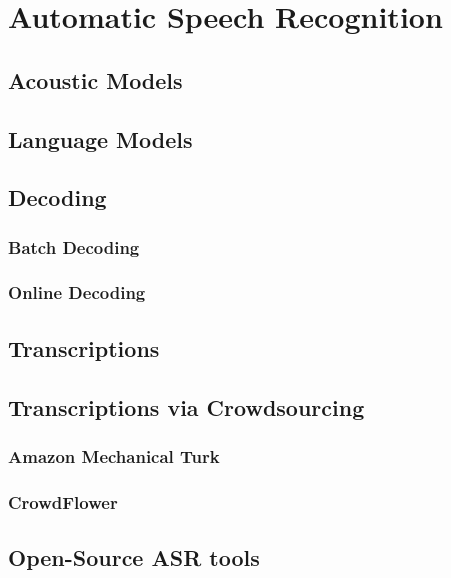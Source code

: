 \chapter{Automatic Speech Recognition}
\blindtext

\section{Acoustic Models}
\blindtext
\blindtext

\section{Language Models}
\blindtext
\blindtext

\section{Decoding}
\blindtext

\subsection{Batch Decoding}
\blindtext

\subsection{Online Decoding}
\blindtext


\section{Transcriptions}
\blindtext

\section{Transcriptions via Crowdsourcing}
\blindtext

\subsection{Amazon Mechanical Turk}
\blindtext

\subsection{CrowdFlower}
\blindtext


\section{Open-Source ASR tools}
\blindtext

